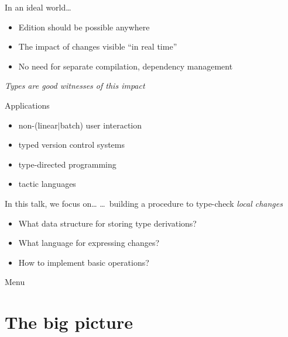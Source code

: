 \documentclass[ignorenonframetext,red]{beamer}
\begin{document}
\begin{frame}{In an ideal world\ldots}
  \begin{itemize}
  \item Edition should be possible anywhere
  \item The impact of changes visible “in real time”
  \item No need for separate compilation, dependency management
  \end{itemize}
  \pause
  \vspace{2em}
  \begin{center}
    {\large \it Types are good witnesses of this impact}
  \end{center}
  \vspace{1em}
  \pause
  \begin{block}{Applications}
    \small
    \begin{itemize}
    \item non-(linear$|$batch) user interaction
    \item typed version control systems
    \item type-directed programming
    \item tactic languages
    \end{itemize}
  \end{block}
\end{frame}

\begin{frame}{In this talk, we focus on\ldots}
  \ldots\ building a procedure to type-check \emph{local changes}

  \begin{itemize}
  \item What data structure for storing type derivations?
  \item What language for expressing changes?
  \item How to implement basic operations?
  \end{itemize}
\end{frame}

\begin{frame}{Menu}
  \tableofcontents
\end{frame}

\section{The big picture}
\end{document}
